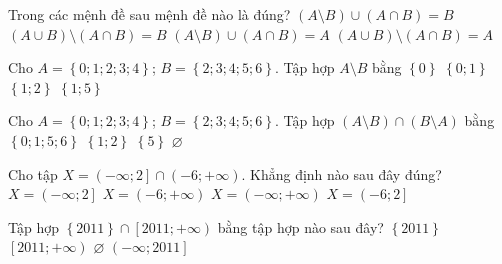 \begin{ex}%
	Trong các mệnh đề sau mệnh đề nào là đúng?
	\choice
	{$\left(A\setminus B\right)\cup\left(A\cap B\right)=B$}
	{$\left(A\cup B\right)\setminus\left(A\cap B\right)=B$}
	{\True $\left(A\setminus B\right)\cup\left(A\cap B\right)=A$}
	{$\left(A\cup B\right)\setminus\left(A\cap B\right)=A$}
\end{ex}

\begin{ex}%
	Cho $ A=\left\{0;1;2;3;4\right\}$; $B=\left\{2;3;4;5;6\right\}$. Tập hợp $ A\setminus B$ bằng
	\choice
	{$\left\{ 0\right\}$}
	{\True $\left\{0;1\right\}$}
	{$\left\{1;2\right\}$}
	{$\left\{1;5\right\}$}
\end{ex}

\begin{ex}%
	Cho $ A=\left\{0;1;2;3;4\right\}$; $B=\left\{2;3;4;5;6\right\}$. Tập hợp $\left(A\setminus B\right)\cap\left(B\setminus A\right)$ bằng
	\choice
	{$\left\{0;1;5;6\right\}$}
	{$\left\{1;2\right\}$}
	{$\left\{5\right\}$}
	{\True $\varnothing$}
\end{ex}

\begin{ex}%
	Cho tập $X=\left(-\infty ;2\right]\cap\left(-6;+\infty \right)$. Khẳng định nào sau đây đúng?
	\choice
	{$X=\left(-\infty ;2\right]$}
	{$X=\left(-6;+\infty \right)$}
	{$X=\left(-\infty ;+\infty \right)$}
	{\True $X=\left(-6;2\right]$}
	\loigiai{
		Ta có $X=\left(-6;2\right]$.
	}
\end{ex}

\begin{ex}%
    Tập hợp $\left\{ 2011\right\}\cap \left[2011;+\infty \right)$ bằng tập hợp nào sau đây?
    \choice
    {\True $\left\{ 2011\right\}$}
    {$\left[2011;+\infty \right)$}
    {$\varnothing $}
    {$\left(-\infty ;2011\right]$}
    \loigiai{
    	Ta có $\left\{ 2011\right\}\cap \left[2011;+\infty \right)=\left\{2011\right\}$.	
	}
\end{ex}

